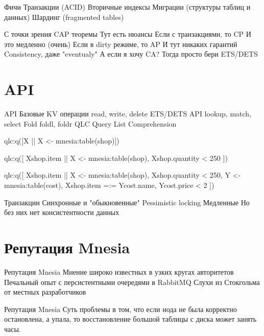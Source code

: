 \documentclass{beamer}
\begin{document}
\begin{frame}
 Фичи
Транзакции (ACID)
Вторичные индексы
Миграции (структуры таблиц и данных)
Шардинг (fragmented tables)
\end{frame}

\begin{frame}
 С точки зрения CAP теоремы
Тут есть нюансы
 Если с транзакциями, то CP
И это медленно (очень)
 Если в dirty режиме, то AP
И тут никаких гарантий Consistency, даже "eventualy"
 А если я хочу CA?
Тогда просто бери ETS/DETS
\end{frame}

\section{API}

\begin{frame}
 API
 Базовые KV операции
read, write, delete
 ETS/DETS API
lookup, match, select
 Fold
foldl, foldr
 QLC
Query List Comprehension
\end{frame}

\begin{frame}
qlc:q([X || X <- mnesia:table(shop)])

qlc:q([
    Xshop.item || X <- mnesia:table(shop),
    Xshop.quantity < 250
])

qlc:q([
    Xshop.item ||
    X <- mnesia:table(shop),
    Xshop.quantity < 250,
    Y <- mnesia:table(cost),
    Xshop.item =:= Ycost.name,
    Ycost.price < 2
])
\end{frame}

\begin{frame}
 Транзакции
Синхронные и "обыкновенные"
Pessimistic locking
Медленные
Но без них нет консистентности данных
\end{frame}

\section{Репутация Mnesia}

\begin{frame}
 Репутация Mnesia
Мнение широко известных в узких кругах авторитетов
Печальный опыт с персистентными очередями в RabbitMQ
Слухи из Стокгольма от местных разработчиков
\end{frame}

\begin{frame}
 Репутация Mnesia
Суть проблемы в том,
что если нода не была корректно остановлена, а упала,
то восстановление большой таблицы с диска может занять часы.
\end{frame}
\end{document}
